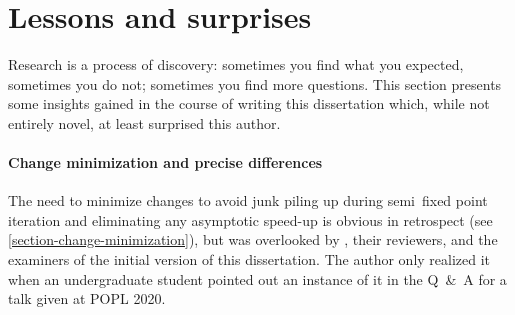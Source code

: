 


  




\section{Lessons and surprises}

Research is a process of discovery: sometimes you find what you expected,
sometimes you do not; sometimes you find more questions. This section presents
some insights gained in the course of writing this dissertation which, while not
entirely novel, at least surprised this author.

\paragraph{Change minimization and precise differences}

The need to minimize changes to avoid junk piling up during semi\naive\ fixed
point iteration and eliminating any asymptotic speed-up is obvious in retrospect
(see \cref{section-change-minimization}), but was overlooked by
\cite{seminaive-datafun}, their reviewers, and the examiners of the initial
version of this dissertation. The author only realized it when an undergraduate
student pointed out an instance of it in the Q~\&~A for a talk given at POPL
2020.

